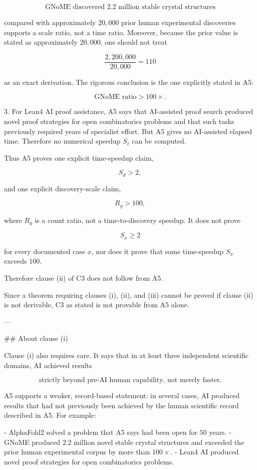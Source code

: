    \[
   \text{GNoME discovered }2.2\text{ million stable crystal structures}
   \]

   compared with approximately \(20{,}000\) prior human experimental discoveries supports a scale ratio, not a time ratio. Moreover, because the prior value is stated as approximately \(20{,}000\), one should not treat

   \[
   \frac{2{,}200{,}000}{20{,}000}=110
   \]

   as an exact derivation. The rigorous conclusion is the one explicitly stated in A5:

   \[
   \text{GNoME ratio}>100\times.
   \]

3. For Lean4 AI proof assistance, A5 says that AI-assisted proof search produced novel proof strategies for open combinatorics problems and that such tasks previously required years of specialist effort. But A5 gives no AI-assisted elapsed time. Therefore no numerical speedup \(S_\ell\) can be computed.

Thus A5 proves one explicit time-speedup claim,

\[
S_d>2,
\]

and one explicit discovery-scale claim,

\[
R_g>100,
\]

where \(R_g\) is a count ratio, not a time-to-discovery speedup. It does not prove

\[
S_x\ge 2
\]

for every documented case \(x\), nor does it prove that some time-speedup \(S_x\) exceeds \(100\).

Therefore clause (ii) of C3 does not follow from A5.

Since a theorem requiring clauses (i), (ii), and (iii) cannot be proved if clause (ii) is not derivable, C3 as stated is not provable from A5 alone.

---

## About clause (i)

Clause (i) also requires care. It says that in at least three independent scientific domains, AI achieved results

\[
\text{strictly beyond pre-AI human capability, not merely faster}.
\]

A5 supports a weaker, record-based statement: in several cases, AI produced results that had not previously been achieved by the human scientific record described in A5. For example:

- AlphaFold2 solved a problem that A5 says had been open for \(50\) years.
- GNoME produced \(2.2\) million novel stable crystal structures and exceeded the prior human experimental corpus by more than \(100\times\).
- Lean4 AI produced novel proof strategies for open combinatorics problems.


